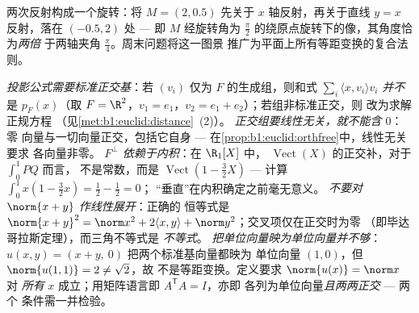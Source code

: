 \begin{omfigure}

{\small 两次反射构成一个旋转：将 $M = (2,
0.5)$ 先关于 $x$ 轴反射，再关于直线 $y = x$ 反射，落在
$(-0.5, 2)$ 处 --- 即 $M$ 经旋转角为
$\frac\pi2$ 的绕原点旋转下的像，其角度恰为\emph{两倍}
于两轴夹角 $\frac\pi4$。周末问题将这一图景
推广为平面上所有等距变换的复合法则。}
\end{omfigure}

\begin{remark}[常见误区]
\label{rem:b1:euclid:pitfalls}
\emph{投影公式需要标准正交基}：若
$(v_i)$ 仅为 $F$ 的生成组，则和式 $\sum_i\langle
x, v_i\rangle v_i$ \emph{并不}是 $p_F(x)$（取 $F = \R^2$，$v_1
= e_1$，$v_2 = e_1 + e_2$）；若组非标准正交，则
改为求解正规方程
（见\cref{met:b1:euclid:distance}~(2)）。
\emph{正交组要线性无关，就不能含 $0$}：零
向量与一切向量正交，包括它自身 ---
在\cref{prop:b1:euclid:orthfree}中，线性无关要求
各向量非零。
\emph{$F^\perp$ 依赖于内积}：在 $\R_1[X]$ 中，
$\operatorname{Vect}(X)$ 的正交补，对于 $\int_0^1 PQ$ 而言，
不是常数，而是 $\operatorname{Vect}(1 - \frac32 X)$ ---
计算 $\int_0^1 x(1 - \frac32 x) = \frac12 - \frac12 = 0$；
“垂直”在内积确定之前毫无意义。
\emph{不要对 $\norm{x + y}$ 作线性展开}：正确的
恒等式是 $\norm{x+y}^2 = \norm x^2 + 2\langle x, y\rangle +
\norm y^2$；交叉项仅在正交时为零
（即毕达哥拉斯定理），而三角不等式是
\emph{不等式}。
\emph{把单位向量映为单位向量并不够}：$u(x,
y) = (x + y,\ 0)$ 把两个标准基向量都映为
单位向量 $(1, 0)$，但 $\norm{u(1,1)} = 2 \neq \sqrt2$，故
不是等距变换。定义要求 $\norm{u(x)} = \norm x$ 对
\emph{所有} $x$ 成立；用矩阵语言即 $A^{\mathsf T}A = I$，亦即
各列为单位向量\emph{且两两正交} --- 两个
条件需一并检验。
\end{remark}

